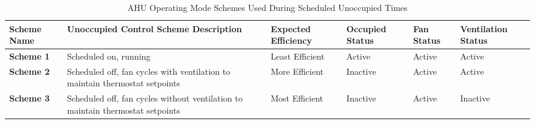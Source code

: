 \begin{table}[h!]
\centering
\caption{AHU Operating Mode Schemes Used During Scheduled Unoccupied Times}
\label{tab:unnoc_ahu_schemes}
\begin{tabular}{|p{2.2cm}|p{4cm}|p{2cm}|p{2cm}|p{2cm}|p{2cm}|}
\hline
\textbf{Scheme Name} &
  \textbf{Unoccupied Control Scheme Description} &
  \textbf{Expected Efficiency} &
  \textbf{Occupied Status} &
  \textbf{Fan Status} &
  \textbf{Ventilation Status} \\ \hline
\textbf{Scheme 1} & Scheduled on, running                                                            & Least Efficient & Active   & Active & Active   \\ \hline
\textbf{Scheme 2} & Scheduled off, fan cycles with ventilation to maintain thermostat   setpoints    & More Efficient  & Inactive & Active & Active   \\ \hline
\textbf{Scheme 3} & Scheduled off, fan cycles without ventilation to maintain thermostat   setpoints & Most Efficient  & Inactive & Active & Inactive \\ \hline
\end{tabular}
\end{table}
